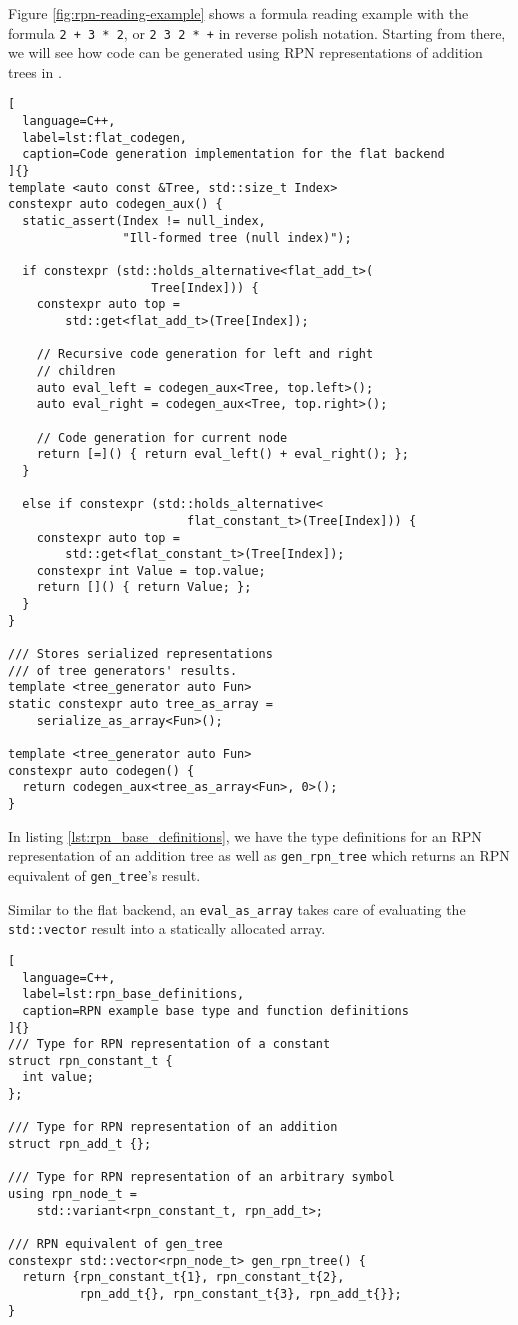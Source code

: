 \documentclass[../main]{subfiles}
\begin{document}
Figure \ref{fig:rpn-reading-example} shows a formula reading example with
the formula \lstinline{2 + 3 * 2}, or \lstinline{2 3 2 * +} in
reverse polish notation. Starting from there,
we will see how code can be generated using RPN representations
of addition trees in \cpp.

\begin{lstlisting}[
  language=C++,
  label=lst:flat_codegen,
  caption=Code generation implementation for the flat backend
]{}
template <auto const &Tree, std::size_t Index>
constexpr auto codegen_aux() {
  static_assert(Index != null_index,
                "Ill-formed tree (null index)");

  if constexpr (std::holds_alternative<flat_add_t>(
                    Tree[Index])) {
    constexpr auto top =
        std::get<flat_add_t>(Tree[Index]);

    // Recursive code generation for left and right
    // children
    auto eval_left = codegen_aux<Tree, top.left>();
    auto eval_right = codegen_aux<Tree, top.right>();

    // Code generation for current node
    return [=]() { return eval_left() + eval_right(); };
  }

  else if constexpr (std::holds_alternative<
                         flat_constant_t>(Tree[Index])) {
    constexpr auto top =
        std::get<flat_constant_t>(Tree[Index]);
    constexpr int Value = top.value;
    return []() { return Value; };
  }
}

/// Stores serialized representations
/// of tree generators' results.
template <tree_generator auto Fun>
static constexpr auto tree_as_array =
    serialize_as_array<Fun>();

template <tree_generator auto Fun>
constexpr auto codegen() {
  return codegen_aux<tree_as_array<Fun>, 0>();
}
\end{lstlisting}

\clearpage%

In listing \ref{lst:rpn_base_definitions}, we have the type definitions for an
RPN representation of an addition tree as well as \lstinline{gen_rpn_tree} which
returns an RPN equivalent of \lstinline{gen_tree}'s result.

Similar to the flat backend, an \lstinline{eval_as_array} takes care
of evaluating the \lstinline{std::vector} result into a statically
allocated array.

\begin{lstlisting}[
  language=C++,
  label=lst:rpn_base_definitions,
  caption=RPN example base type and function definitions
]{}
/// Type for RPN representation of a constant
struct rpn_constant_t {
  int value;
};

/// Type for RPN representation of an addition
struct rpn_add_t {};

/// Type for RPN representation of an arbitrary symbol
using rpn_node_t =
    std::variant<rpn_constant_t, rpn_add_t>;

/// RPN equivalent of gen_tree
constexpr std::vector<rpn_node_t> gen_rpn_tree() {
  return {rpn_constant_t{1}, rpn_constant_t{2},
          rpn_add_t{}, rpn_constant_t{3}, rpn_add_t{}};
}
\end{lstlisting}
\end{document}
